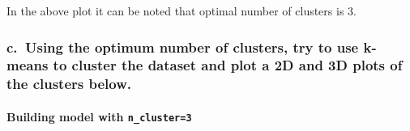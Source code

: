 \documentclass[11pt]{article}
\begin{document}
    In the above plot it can be noted that optimal number of clusters is 3.

    \hypertarget{c.-using-the-optimum-number-of-clusters-try-to-use-k-means-to-cluster-the-dataset-and-plot-a-2d-and-3d-plots-of-the-clusters-below.}{%
\subsubsection{c.~Using the optimum number of clusters, try to use
k-means to cluster the dataset and plot a 2D and 3D plots of the
clusters
below.}\label{c.-using-the-optimum-number-of-clusters-try-to-use-k-means-to-cluster-the-dataset-and-plot-a-2d-and-3d-plots-of-the-clusters-below.}}

\hypertarget{building-model-with-n_cluster3}{%
\paragraph{\texorpdfstring{Building model with
\texttt{n\_cluster=3}}{Building model with n\_cluster=3}}\label{building-model-with-n_cluster3}}
\end{document}
